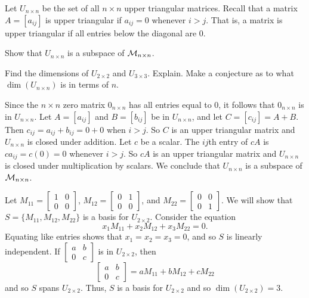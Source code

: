 \begin{example} Let $U_{n \times n}$ be the set of all $n \times n$ upper triangular matrices. Recall that a matrix $A = [a_{ij}]$ is upper triangular if $a_{ij} = 0$ whenever $i > j$. That is, a matrix is upper triangular if all entries below the diagonal are 0. 
	\ba
	\item Show that $U_{n \times n}$ is a subspace of $\mathcal{M}_{n \times n}$. 

	\item Find the dimensions of $U_{2 \times 2}$ and $U_{3 \times 3}$. Explain. Make a conjecture as to what $\dim(U_{n \times n})$ is in terms of $n$.
	 
	 \ea

\ExampleSolution
\ba
\item Since the $n \times n$ zero matrix $0_{n \times n}$ has all entries equal to 0, it follows that $0_{n \times n}$ is in $U_{n \times n}$.  Let $A = [a_{ij}]$ and $B = [b_{ij}]$ be in $U_{n \times n}$, and let $C = [c_{ij}] = A+B$. Then $c_{ij} = a_{ij} + b_{ij} = 0 + 0$ when $i > j$. So $C$ is an upper triangular matrix and $U_{n \times n}$ is closed under addition. Let $c$ be a scalar. The $ij$th entry of $cA$ is $ca_{ij} = c(0) = 0$ whenever $i > j$. So $cA$ is an upper triangular matrix and $U_{n \times n}$ is closed under multiplication by scalars. We conclude that $U_{n \times n}$ is a subspace of $\mathcal{M}_{n \times n}$. 

\item  Let $M_{11} = \left[ \begin{array}{cc} 1&0 \\ 0&0 \end{array} \right]$, $M_{12} = \left[ \begin{array}{cc} 0&1 \\ 0&0 \end{array} \right]$, and $M_{22}=\left[ \begin{array}{cc} 0&0 \\ 0&1 \end{array} \right]$. We will show that $S = \{M_{11}, M_{12}, M_{22}\}$ is a basis for $U_{2 \times 2}$.  Consider the equation 
\[x_1M_{11} + x_2M_{12} + x_3 M_{22} = 0.\]
Equating like entries shows that $x_1 = x_2 = x_3 = 0$, and so $S$ is linearly independent. If $\left[ \begin{array}{cc} a&b \\ 0&c \end{array} \right]$ is in $U_{2 \times 2}$, then 
\[\left[ \begin{array}{cc} a&b \\ 0&c \end{array} \right] = aM_{11} + bM_{12} + cM_{22}\]
and so $S$ spans $U_{2 \times 2}$. Thus, $S$ is a basis for $U_{2 \times 2}$ and so $\dim(U_{2 \times 2}) = 3$. 


\end{example}
